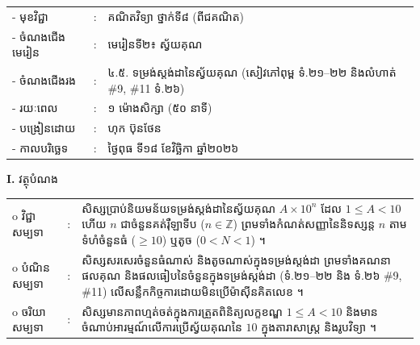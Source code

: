 \documentclass[a4paper,10pt]{article}
\newcommand{\wcirc}{{\CourierBullet\fontsize{9.5pt}{11pt}\selectfont o}}
\begin{document}
{\renewcommand{\arraystretch}{0.98}
\hspace*{3.1cm}%
\begin{tabular}{@{}l l L{11.0cm}@{}}
  - \hspace{0.35cm} មុខវិជ្ជា & : & គណិតវិទ្យា ថ្នាក់ទី៨ (ពីជគណិត) \\
  - \hspace{0.35cm} ចំណងជើងមេរៀន & : & មេរៀនទី២៖ ស្វ័យគុណ \\
  - \hspace{0.35cm} ចំណងជើងរង & : & ៤.៥. ទម្រង់ស្តង់ដានៃស្វ័យគុណ (សៀវភៅពុម្ព ទំ.២១–២២ និងលំហាត់ \#9, \#11 ទំ.២៦) \\
  - \hspace{0.35cm} រយៈពេល & : & ១ ម៉ោងសិក្សា (៥០ នាទី) \\
  - \hspace{0.35cm} បង្រៀនដោយ & : & ហុក ប៊ុនថែន \\
  - \hspace{0.35cm} កាលបរិច្ឆេទ & : & ថ្ងៃពុធ ទី១៨ ខែវិច្ឆិកា ឆ្នាំ២០២៦ \\
\end{tabular}

\vspace{2pt}

\textbf{I.} {\muol វត្ថុបំណង}\\[1pt]
\hspace*{0.55cm}%
\begin{tabular}{@{}l l L{14.2cm}@{}}
  \wcirc \hspace{0.25cm} វិជ្ជាសម្បទា & : & សិស្សប្រាប់និយមន័យទម្រង់ស្តង់ដានៃស្វ័យគុណ $A\times 10^n$ ដែល $1\le A < 10$ ហើយ $n$ ជាចំនួនគត់រ៉ឺឡាទីប ($n\in\mathbb{Z}$) ព្រមទាំងកំណត់សញ្ញានៃនិទស្សន្ត $n$ តាមទំហំចំនួនធំ ($\ge 10$) ឬតូច ($0<N<1$) ។ \\
  \wcirc \hspace{0.25cm} បំណិនសម្បទា & : & សិស្សសរសេរចំនួនធំណាស់ និងតូចណាស់ក្នុងទម្រង់ស្តង់ដា ព្រមទាំងគណនាផលគុណ និងផលធៀបនៃចំនួនក្នុងទម្រង់ស្តង់ដា (ទំ.២១–២២ និង ទំ.២៦ \#9, \#11) លើសន្លឹកកិច្ចការដោយមិនប្រើម៉ាស៊ីនគិតលេខ ។ \\
  \wcirc \hspace{0.25cm} ចរិយាសម្បទា & : & សិស្សមានភាពហ្មត់ចត់ក្នុងការត្រួតពិនិត្យលក្ខខណ្ឌ $1\le A < 10$ និងមានចំណាប់អារម្មណ៍លើការប្រើស្វ័យគុណនៃ $10$ ក្នុងតារាសាស្ត្រ និងរូបវិទ្យា ។ \\
\end{tabular}

\vspace{2pt}

}
\end{document}
